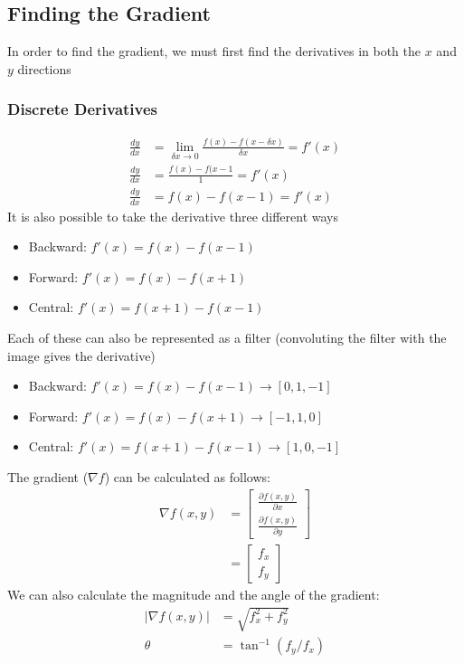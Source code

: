 \documentclass{article}
\begin{document}
\subsection{Finding the Gradient}
In order to find the gradient, we must first find the derivatives in both the $x$ and $y$ directions
\subsubsection{Discrete Derivatives}
\begin{align*}
\frac{dy}{dx} &= \lim_{\delta x\rightarrow0}\frac{f(x)-f(x-\delta x)}{\delta x} = f'(x)\\
\frac{dy}{dx} &= \frac{f(x)-f(x-1}{1} = f'(x)\\
\frac{dy}{dx} &= f(x)-f(x-1) = f'(x)
\end{align*}
It is also possible to take the derivative three different ways
\begin{itemize}
\item Backward: $f'(x) = f(x)-f(x-1)$
\item Forward: $f'(x) = f(x)-f(x+1)$
\item Central: $f'(x) = f(x+1)-f(x-1)$
\end{itemize}
Each of these can also be represented as a filter (convoluting the filter with the image gives the derivative)
\begin{itemize}
\item Backward: $f'(x) = f(x)-f(x-1)\rightarrow[0,1,-1]$
\item Forward: $f'(x) = f(x)-f(x+1)\rightarrow[-1,1,0]$
\item Central: $f'(x) = f(x+1)-f(x-1)\rightarrow[1,0,-1]$
\end{itemize}
The gradient ($\nabla f$) can be calculated as follows:
\begin{align*}
\nabla f(x,y) &= \begin{bmatrix}%
    \frac{\partial f(x,y)}{\partial x}\\
    \frac{\partial f(x,y)}{\partial y}
    \end{bmatrix}\\
    &= \begin{bmatrix}%
    f_x\\
    f_y
    \end{bmatrix}
\end{align*}
We can also calculate the magnitude and the angle of the gradient:
\begin{align*}
|\nabla f(x,y)| &= \sqrt{f_x^2+f_y^2}\\
\theta &= \tan^{-1}\left(f_y/f_x\right)
\end{align*}
\end{document}

